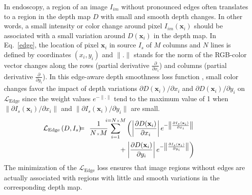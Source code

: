 \documentclass[a4paper,fleqn]{cas-dc}
\begin{document}
{\vspace*{2mm}
%
In endoscopy, a region of an image $I_{im}$ without pronounced edges often translates to a region in the depth map $D$ with  small and smooth depth changes. In other words, a small intensity or color change around pixel $I_{im}(\mathbf{x}_i)$ should be associated with a small variation around $D(\mathbf{x}_i)$ in the depth map. In Eq.~\eqref{edge}, the location of pixel $\mathbf{x}_i$ in source $I_{s}$ of $M$ columns and $N$ lines is defined by coordinates $(x_i, y_i)$ and $\|.\|$ stands for the norm of the RGB-color vector changes along the rows (partial derivative $\scriptstyle \frac{\partial}{\partial x_i}$) and columns (partial derivative $\scriptstyle \frac{\partial}{\partial y_i}$). In this edge-aware depth smoothness loss function \citep{Godard_ICCV_2019}, small color changes favor the impact of depth variations $\partial D(\mathbf{x}_i)/\partial x_i$ and $\partial D(\mathbf{x}_i)/\partial y_i$ on $\mathcal{L}_{\textrm{Edge}}$ since the weight values $e^{-\|.\|}$ tend to the maximum value of 1 when $\|\partial I_s(\mathbf{x}_i)/\partial x_i\|$ and $\|\partial I_s(\mathbf{x}_i)/\partial y_i\|$ are small.
%
\begin{eqnarray} \label{edge} \hspace{-8 mm}
\mathcal{L}_{\textrm{Edge}}\left(D, I_s\right) \hspace{-2 mm}&=&\hspace{-2 mm} \frac{1}{N{\scriptscriptstyle \times}M} \hspace{-2 mm} \sum_{i=1}^{i=N{\scriptscriptstyle \times}M} \left(
\left| \frac{\partial D(\mathbf{x}_i)}{\partial x_i} \right| e^{-\left\|\frac{\partial I_{s}(\mathbf{x}_i)}{\partial x_i}\right\|} \nonumber \right.\\ 
%
& & \hspace{15 mm}+ 
%
\left.\left| \frac{\partial D(\mathbf{x}_i)}{\partial y_i} \right| e^{-\left\|\frac{\partial I_{s}(\mathbf{x}_i)}{\partial y_i}\right\|}\right)
\end{eqnarray}
%
The minimization of the $\mathcal{L}_{\textrm{Edge}}$ loss ensures that image regions without edges  are actually associated with regions with little and smooth variations in the corresponding depth map.  
%
}
\end{document}
